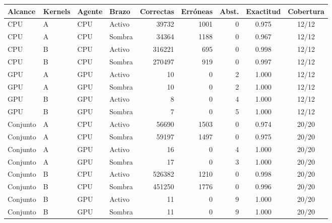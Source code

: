 \begin{tabular}{@{}llllrrrcc@{}}
\toprule
\textbf{Alcance} & \textbf{Kernels} & \textbf{Agente} & \textbf{Brazo} & \textbf{Correctas} & \textbf{Erróneas} & \textbf{Abst.} & \textbf{Exactitud} & \textbf{Cobertura} \\
\midrule
CPU & A & CPU & Activo & 39732 & 1001 & 0 & 0.975 & 12/12 \\
CPU & A & CPU & Sombra & 34364 & 1188 & 0 & 0.967 & 12/12 \\
CPU & B & CPU & Activo & 316221 & 695 & 0 & 0.998 & 12/12 \\
CPU & B & CPU & Sombra & 270497 & 919 & 0 & 0.997 & 12/12 \\
GPU & A & GPU & Activo & 10 & 0 & 2 & 1.000 & 12/12 \\
GPU & A & GPU & Sombra & 10 & 0 & 2 & 1.000 & 12/12 \\
GPU & B & GPU & Activo & 8 & 0 & 4 & 1.000 & 12/12 \\
GPU & B & GPU & Sombra & 7 & 0 & 5 & 1.000 & 12/12 \\
Conjunto & A & CPU & Activo & 56690 & 1503 & 0 & 0.974 & 20/20 \\
Conjunto & A & CPU & Sombra & 59197 & 1497 & 0 & 0.975 & 20/20 \\
Conjunto & A & GPU & Activo & 16 & 0 & 4 & 1.000 & 20/20 \\
Conjunto & A & GPU & Sombra & 17 & 0 & 3 & 1.000 & 20/20 \\
Conjunto & B & CPU & Activo & 526382 & 1210 & 0 & 0.998 & 20/20 \\
Conjunto & B & CPU & Sombra & 451250 & 1776 & 0 & 0.996 & 20/20 \\
Conjunto & B & GPU & Activo & 11 & 0 & 9 & 1.000 & 20/20 \\
Conjunto & B & GPU & Sombra & 11 & 0 & 9 & 1.000 & 20/20 \\
\bottomrule
\end{tabular}
